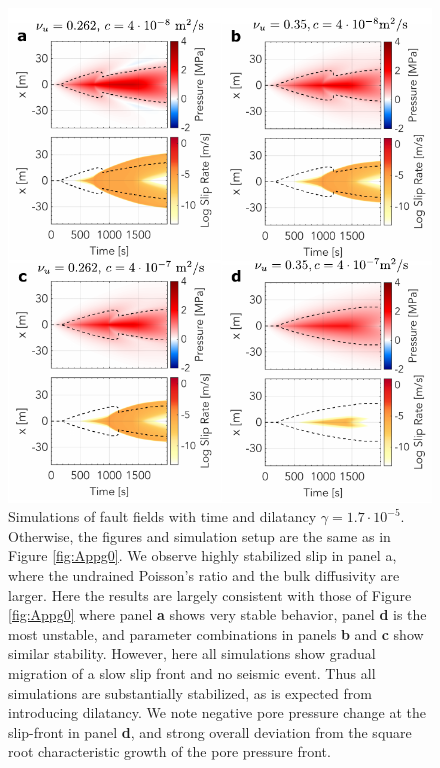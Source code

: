 \documentclass[draft]{agujournal2019}
\begin{document}
\begin{figure}[H]
\centering
\includegraphics[scale =  0.95]{Figures/gammasmall_comparison.pdf} %
\caption{
Simulations of fault fields with time and dilatancy $\gamma = 1.7 \cdot 10^{-5}$. Otherwise, the figures and simulation setup are the same as in Figure \ref{fig:Appg0}. We observe highly stabilized slip in panel a, where the undrained Poisson's ratio and the bulk diffusivity are larger. Here the results are largely consistent with those of Figure \ref{fig:Appg0} where panel {\bf a} shows very stable behavior, panel {\bf d} is the most unstable, and parameter combinations in panels {\bf b} and {\bf c} show similar stability. However, here all simulations show gradual migration of a slow slip front and no seismic event. Thus all simulations are substantially stabilized, as is expected from introducing dilatancy. We note negative pore pressure change at the slip-front in panel {\bf d}, and strong overall deviation from the square root characteristic growth of the pore pressure front. }
\label{fig:Appgs}
\end{figure}
\end{document}
